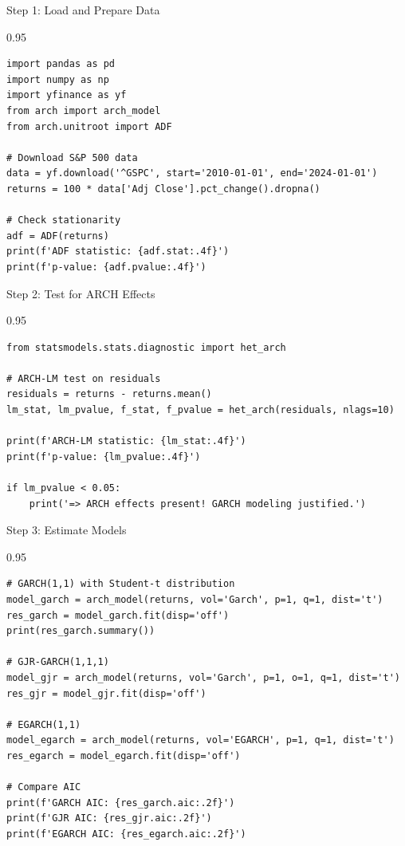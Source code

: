 \documentclass[9pt, aspectratio=169, t]{beamer}
\begin{document}
\begin{frame}[fragile]{Step 1: Load and Prepare Data}
    \begin{cminipage}{0.95\textwidth}
\begin{verbatim}
import pandas as pd
import numpy as np
import yfinance as yf
from arch import arch_model
from arch.unitroot import ADF

# Download S&P 500 data
data = yf.download('^GSPC', start='2010-01-01', end='2024-01-01')
returns = 100 * data['Adj Close'].pct_change().dropna()

# Check stationarity
adf = ADF(returns)
print(f'ADF statistic: {adf.stat:.4f}')
print(f'p-value: {adf.pvalue:.4f}')
\end{verbatim}
    \end{cminipage}
\end{frame}

\begin{frame}[fragile]{Step 2: Test for ARCH Effects}
    \begin{cminipage}{0.95\textwidth}
\begin{verbatim}
from statsmodels.stats.diagnostic import het_arch

# ARCH-LM test on residuals
residuals = returns - returns.mean()
lm_stat, lm_pvalue, f_stat, f_pvalue = het_arch(residuals, nlags=10)

print(f'ARCH-LM statistic: {lm_stat:.4f}')
print(f'p-value: {lm_pvalue:.4f}')

if lm_pvalue < 0.05:
    print('=> ARCH effects present! GARCH modeling justified.')
\end{verbatim}
    \end{cminipage}
\end{frame}

\begin{frame}[fragile]{Step 3: Estimate Models}
    \begin{cminipage}{0.95\textwidth}
    \vspace{-0.4cm}
\begin{verbatim}
# GARCH(1,1) with Student-t distribution
model_garch = arch_model(returns, vol='Garch', p=1, q=1, dist='t')
res_garch = model_garch.fit(disp='off')
print(res_garch.summary())

# GJR-GARCH(1,1,1)
model_gjr = arch_model(returns, vol='Garch', p=1, o=1, q=1, dist='t')
res_gjr = model_gjr.fit(disp='off')

# EGARCH(1,1)
model_egarch = arch_model(returns, vol='EGARCH', p=1, q=1, dist='t')
res_egarch = model_egarch.fit(disp='off')

# Compare AIC
print(f'GARCH AIC: {res_garch.aic:.2f}')
print(f'GJR AIC: {res_gjr.aic:.2f}')
print(f'EGARCH AIC: {res_egarch.aic:.2f}')
\end{verbatim}
    \end{cminipage}
\end{frame}
\end{document}
